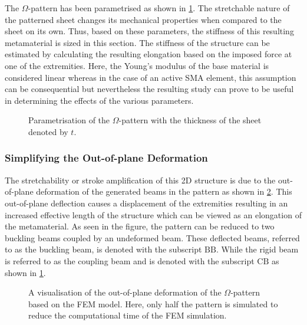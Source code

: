 The $\Omega$-pattern has been parametrised as shown in \cref{fig:kirigami-param}. The stretchable nature of the patterned sheet changes its mechanical properties when compared to the sheet on its own. Thus, based on these parameters, the stiffness of this resulting metamaterial is sized in this section. The stiffness of the structure can be estimated by calculating the resulting elongation based on the imposed force at one of the extremities. Here, the Young's modulus of the base material is considered linear whereas in the case of an active SMA element, this assumption can be consequential but nevertheless the resulting study can prove to be useful in determining the effects of the various parameters.

\begin{figure}[hbt!]
    \centering
    
    \caption[Parametrisation of the $\Omega$-pattern]{Parametrisation of the $\Omega$-pattern with the thickness of the sheet denoted by $t$.}
    \label{fig:kirigami-param}
\end{figure}

\subsubsection{Simplifying the Out-of-plane Deformation}
The stretchability or stroke amplification of this 2D structure is due to the out-of-plane deformation of the generated beams in the pattern as shown in \cref{fig:ohm-pattern-deformed}. This out-of-plane deflection causes a displacement of the extremities resulting in an increased effective length of the structure which can be viewed as an elongation of the metamaterial. As seen in the figure, the pattern can be reduced to two buckling beams coupled by an undeformed beam. These deflected beams, referred to as the buckling beam, is denoted with the subscript $\mathrm{BB}$. While the rigid beam is referred to as the coupling beam and is denoted with the subscript $\mathrm{CB}$ as shown in \cref{fig:kirigami-param}.

\begin{figure}[hbt]
    \centering
    
    \caption[A visualisation of the out-of-plane deformation of the $\Omega$-pattern based on the FEM model]{A visualisation of the out-of-plane deformation of the $\Omega$-pattern based on the FEM model. Here, only half the pattern is simulated to reduce the computational time of the FEM simulation.}
    \label{fig:ohm-pattern-deformed}
\end{figure}

